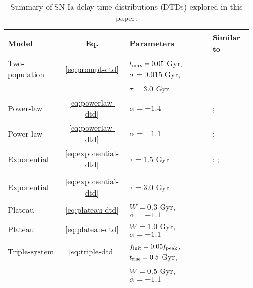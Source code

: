 \documentclass[twocolumn,twocolappendix,linenumbers,trackchanges]{aastex631}
\begin{document}
\begin{table*}
    \centering
    \caption{Summary of SN Ia delay time distributions (DTDs) explored in this paper.\label{tab:dtds}}
    \begin{tabular}{lcll}
        \hline\hline
        Model & Eq. & Parameters & Similar to \\
        \hline
        Two-population  & \ref{eq:prompt-dtd}   & $t_{\rm max}=0.05$ Gyr, $\sigma=0.015$ Gyr, & \citet{Mannucci2006-TwoPopulations} \\
                        &                       & $\tau=3.0$ Gyr & \\
        Power-law   & \ref{eq:powerlaw-dtd} & $\alpha=-1.4$                 & \citet[][cluster]{Maoz2017-CosmicDTD}; 
                                                      \citet{Heringer2019-FieldGalaxyDTD}       \\
        Power-law   & \ref{eq:powerlaw-dtd} & $\alpha=-1.1$                 & \citet[][field]{Maoz2017-CosmicDTD}; 
                                                      \citet{Wiseman2021-DESRates}              \\
        Exponential & \ref{eq:exponential-dtd}  & $\tau=1.5$ Gyr    & \citet[][SD]{Greggio2005-AnalyticalRates};
                                                                      \citet{Schonrich2009-RadialMixing};       \\
                    &                           &                   & \citet{Weinberg2017-ChemicalEquilibrium}  \\
        Exponential & \ref{eq:exponential-dtd}   & $\tau=3.0$ Gyr    & --- \\
        Plateau     & \ref{eq:plateau-dtd}  & $W=0.3$ Gyr, $\alpha=-1.1$    & \citet[][CLOSE DD]{Greggio2005-AnalyticalRates} \\
        Plateau     & \ref{eq:plateau-dtd}  & $W=1.0$ Gyr, $\alpha=-1.1$    & \citet[][WIDE DD]{Greggio2005-AnalyticalRates} \\
        Triple-system   & \ref{eq:triple-dtd}   & $f_{\rm init}=0.05f_{\rm peak}$, $t_{\rm rise}=0.5$ Gyr, & \citet{Rajamuthukumar2023-TripleEvolution} \\
                        &                       & $W=0.5$ Gyr, $\alpha=-1.1$ & \\
        \hline
    \end{tabular}
\end{table*}
\end{document}
